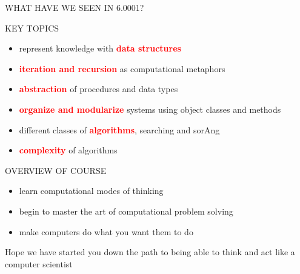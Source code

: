 \documentclass[aspectratio=169]{beamer}
\begin{document}
\begin{frame}
\Huge{WHAT HAVE WE SEEN IN 6.0001?}
\end{frame}

\begin{frame}{KEY TOPICS}
\begin{itemize}
\item represent knowledge with \textcolor{red}{\textbf{data structures}}
\item \textcolor{red}{\textbf{iteration and recursion}} as computational metaphors
\item \textcolor{red}{\textbf{abstraction}} of procedures and data types
\item \textcolor{red}{\textbf{organize and modularize}} systems using object classes and methods
\item different classes of \textcolor{red}{\textbf{algorithms}}, searching and sorAng
\item \textcolor{red}{\textbf{complexity}} of algorithms
\end{itemize}
\end{frame}

\begin{frame}{OVERVIEW OF COURSE}
\begin{itemize}
\item learn computational modes of thinking
\item begin to master the art of computational problem solving
\item make computers do what you want them to do
\end{itemize}
Hope we have started you down the path to being able to think and act like a computer scientist
\end{frame}
\end{document}
